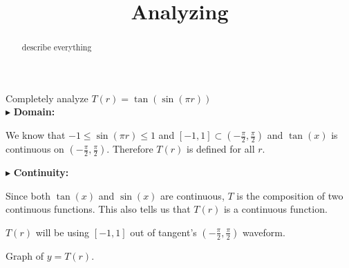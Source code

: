 \documentclass{ximera}
\title{Analyzing}
\begin{document}
\begin{abstract}
describe everything
\end{abstract}
\maketitle







Completely analyze $T(r) = \tan(\sin(\pi r))$ \\




$\blacktriangleright$  \textbf{\textcolor{blue!55!black}{Domain: }}


We know that $-1 \leq \sin(\pi r) \leq 1$ and $[-1,1] \subset \left( -\frac{\pi}{2}, \frac{\pi}{2} \right)$ and $\tan(x)$ is continuous on $\left( -\frac{\pi}{2}, \frac{\pi}{2} \right)$.  Therefore $T(r)$ is defined for all $r$.  




$\blacktriangleright$  \textbf{\textcolor{blue!55!black}{Continuity: }}




Since both $\tan(x)$ and $\sin(x)$ are continuous, $T$ is the composition of two continuous functions. This also tells us that $T(r)$ is a continuous function.















$T(r)$ will be using $[-1,1]$ out of tangent's $\left( -\frac{\pi}{2}, \frac{\pi}{2} \right)$ waveform.



Graph of $y = T(r)$.
\end{document}
